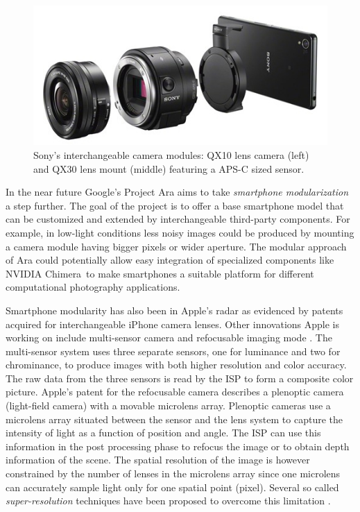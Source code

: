 \documentclass[thesis.tex]{subfiles}
\begin{document}
\begin{figure}[ht]
\centering \includegraphics[width=\textwidth]{images/sony_qx.jpg}
\caption{Sony's interchangeable camera modules: QX10 lens camera (left) and QX30 lens mount (middle) featuring a APS-C sized sensor.\label{figure:sony-qx}}
\end{figure}

In the near future Google's Project Ara aims to take \textit{smartphone modularization} a step further. The goal of the project is to offer a base smartphone model that can be customized and extended by interchangeable third-party components. For example, in low-light conditions less noisy images could be produced by mounting a camera module having bigger pixels or wider aperture. The modular approach of Ara could potentially allow easy integration of specialized components like NVIDIA Chimera\texttrademark\ to make smartphones a suitable platform for different computational photography applications.

Smartphone modularity has also been in Apple's radar as evidenced by patents \cite{apple_patent_camera_module_3}\cite{apple_patent_camera_module_4}\cite{apple_patent_camera_module_5} acquired for interchangeable iPhone camera lenses. Other innovations Apple is working on include multi-sensor camera and refocusable imaging mode \cite{apple_patent_camera_module_1}\cite{apple_patent_camera_module_2}. The multi-sensor system uses three separate sensors, one for luminance and two for chrominance, to produce images with both higher resolution and color accuracy. The raw data from the three sensors is read by the ISP to form a composite color picture. Apple's patent for the refocusable camera describes a plenoptic camera (light-field camera) with a movable microlens array. Plenoptic cameras use a microlens array situated between the sensor and the lens system to capture the intensity of light as a function of position and angle. The ISP can use this information in the post processing phase to refocus the image or to obtain depth information of the scene. The spatial resolution of the image is however constrained by the number of lenses in the microlens array since one microlens can accurately sample light only for one spatial point (pixel). Several so called \textit{super-resolution} techniques have been proposed to overcome this limitation \cite{plenoptic_1}\cite{plenoptic_2}\cite{plenoptic_3}.
\end{document}
